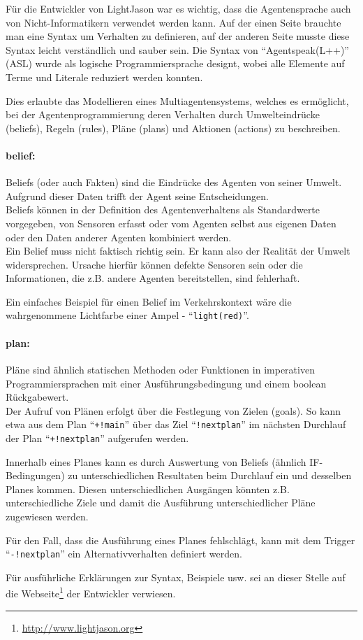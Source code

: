 Für die Entwickler von LightJason war es wichtig, dass die Agentensprache auch von Nicht-Informatikern verwendet werden kann.
Auf der einen Seite brauchte man eine Syntax um Verhalten zu definieren, auf der anderen Seite musste diese Syntax leicht verständlich und sauber sein.
Die Syntax von \enquote{Agentspeak(L++)} (ASL) wurde als logische Programmiersprache \mbox{designt}, wobei alle Elemente auf Terme und Literale reduziert werden konnten.

Dies erlaubte das Modellieren eines Multiagentensystems, welches es ermöglicht, bei der Agentenprogrammierung deren Verhalten durch Umwelteindrücke (beliefs), Regeln (rules), Pläne (plans) und Aktionen (actions) zu beschreiben.

\paragraph*{belief:}
Beliefs (oder auch Fakten) sind die Eindrücke des Agenten von seiner Umwelt.
Aufgrund dieser Daten trifft der Agent seine Entscheidungen.
\\
Beliefs können in der Definition des Agentenverhaltens als Standardwerte vorgegeben, von Sensoren erfasst oder vom Agenten selbst aus eigenen Daten oder den Daten anderer Agenten kombiniert werden.
\\
Ein Belief muss nicht faktisch richtig sein.
Er kann also der Realität der Umwelt widersprechen. 
Ursache hierfür können defekte Sensoren sein oder die Informationen, die z.B. andere Agenten bereitstellen, sind fehlerhaft.

Ein einfaches Beispiel für einen Belief im Verkehrskontext wäre die wahrgenommene Lichtfarbe einer Ampel - \enquote{\texttt{light(red)}}.

\paragraph*{plan:}
Pläne sind ähnlich statischen Methoden oder Funktionen in imperativen Programmiersprachen mit einer Ausführungsbedingung und einem boolean Rückgabewert.
\\
Der Aufruf von Plänen erfolgt über die Festlegung von Zielen (goals).
So kann etwa aus dem Plan \enquote{\texttt{+!main}} über das Ziel \enquote{\texttt{!nextplan}} im nächsten Durchlauf der Plan \enquote{\texttt{+!nextplan}} aufgerufen werden.

Innerhalb eines Planes kann es durch Auswertung von Beliefs (ähnlich IF-Bedingungen) zu unterschiedlichen Resultaten beim Durchlauf ein und desselben Planes kommen.
Diesen unterschiedlichen Ausgängen könnten z.B. unterschiedliche Ziele und damit die Ausführung unterschiedlicher Pläne zugewiesen werden.

Für den Fall, dass die Ausführung eines Planes fehlschlägt, kann mit dem Trigger \enquote{\texttt{-!nextplan}} ein Alternativverhalten definiert werden.

\par\vspace{2.5em}
Für ausführliche Erklärungen zur Syntax, Beispiele usw. sei an dieser Stelle auf die Webseite\footnote{\url{http://www.lightjason.org}} der Entwickler verwiesen.
